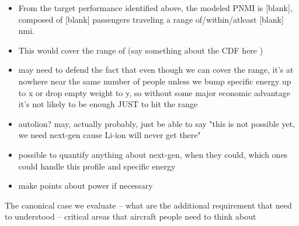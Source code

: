 \begin{itemize}
    \item From the target performance identified above, the modeled PNMI is [blank], composed of [blank] passengers traveling a range of/within/atleast [blank] nmi. 
    \item This would cover the range of (say something about the CDF here )
    \item may need to defend the fact that even though we can cover the range, it's at nowhere near the same number of people unless we bump specific energy up to x or drop empty weight to y, so without some major economic advantage it's not likely to be enough JUST to hit the range
    \item autolion? may, actually probably, just be able to say "this is not possible yet, we need next-gen cause Li-ion will never get there"
    \item possible to quantify anything about next-gen, when they could, which ones could handle this profile and specific energy
    \item make points about power if necessary
\end{itemize}

The canonical case we evaluate -- what are the additional requirement that need to understood -- critical areas that aircraft people need to think about\\

